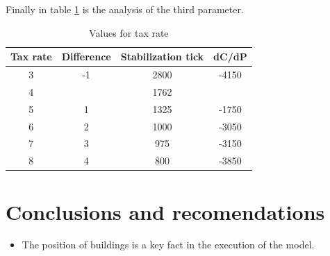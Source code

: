 \documentclass{wscpaperproc}
\begin{document}
Finally in table \ref{table:taxes} is the analysis of the third parameter.

\begin{table}[h!]
    \centering
    \begin{tabular}{|c|c|c|c|}
        \hline
        Tax rate & Difference & Stabilization tick &  dC/dP\\
        \hline
        3 & -1 & 2800 & -4150\\
        \hline
        \rowcolor{lightgray}
        4 &    & 1762 & \\
        \hline
        5 & 1  & 1325 & -1750\\
        \hline
        6 & 2  & 1000 & -3050\\
        \hline
        7 & 3  & 975  & -3150\\
        \hline
        8 & 4  & 800  & -3850\\
        \hline
    \end{tabular}
    \caption{Values for tax rate}
    \label{table:taxes}
\end{table}

\section{Conclusions and recomendations}

\begin{itemize}
    \item The position of buildings is a key fact in the execution of the model.
\end{itemize}



\end{document}
